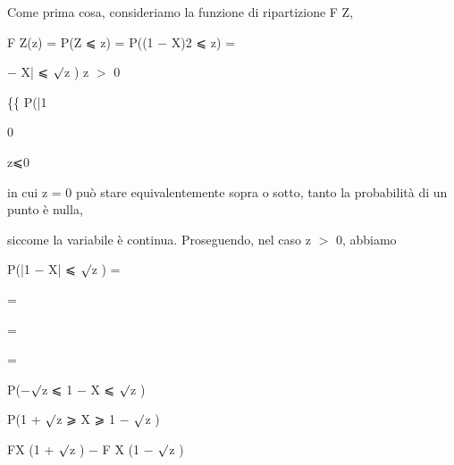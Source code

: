 \documentclass[a4paper,portrait,12pt]{article}
\begin{document}
\begin{flushleft}
Come prima cosa, consideriamo la funzione di ripartizione F Z,
\end{flushleft}


\begin{flushleft}
F Z(z) = P(Z ⩽ z) = P((1 $-$ X)2 ⩽ z) =
\end{flushleft}





\begin{flushleft}
$-$ X| ⩽ $\surd$z ) z $>$ 0
\end{flushleft}


\begin{flushleft}
\{\{ P(|1
\end{flushleft}


0


\begin{flushleft}
z⩽0
\end{flushleft}





\begin{flushleft}
in cui z = 0 pu\`{o} stare equivalentemente sopra o sotto, tanto la probabilit\`{a} di un punto \`{e} nulla,
\end{flushleft}


\begin{flushleft}
siccome la variabile \`{e} continua. Proseguendo, nel caso z $>$ 0, abbiamo
\end{flushleft}


\begin{flushleft}
P(|1 $-$ X| ⩽ $\surd$z ) =
\end{flushleft}


=


=


=





\begin{flushleft}
P($-$$\surd$z ⩽ 1 $-$ X ⩽ $\surd$z )
\end{flushleft}


\begin{flushleft}
P(1 + $\surd$z ⩾ X ⩾ 1 $-$ $\surd$z )
\end{flushleft}


\begin{flushleft}
FX (1 + $\surd$z ) $-$ F X (1 $-$ $\surd$z )
\end{flushleft}
\end{document}
